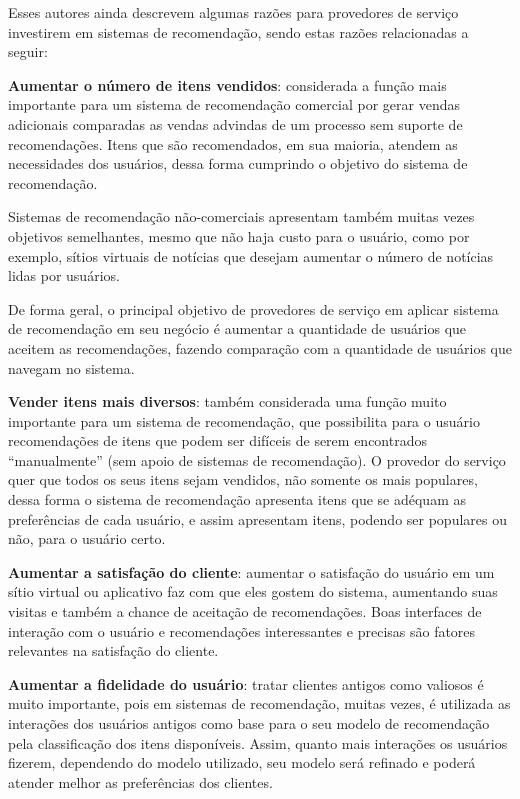 Esses autores ainda descrevem algumas razões para provedores de serviço investirem em sistemas de recomendação, sendo estas razões relacionadas a seguir:

\textbf{Aumentar o número de itens vendidos}: considerada a função mais importante para um sistema de recomendação comercial por gerar vendas adicionais comparadas as vendas advindas de um processo sem suporte de recomendações. Itens que são recomendados, em sua maioria, atendem as necessidades dos usuários, dessa forma cumprindo o objetivo do sistema de recomendação.

Sistemas de recomendação não-comerciais apresentam também muitas vezes objetivos semelhantes, mesmo que não haja custo para o usuário, como por exemplo, sítios virtuais de notícias que desejam aumentar o número de notícias lidas por usuários.

De forma geral, o principal objetivo de provedores de serviço em aplicar sistema de recomendação em seu negócio é aumentar a quantidade de usuários que aceitem as recomendações, fazendo comparação com a quantidade de usuários que navegam no sistema.

\textbf{Vender itens mais diversos}: também considerada uma função muito importante para um sistema de recomendação, que possibilita para o usuário recomendações de itens que podem ser difíceis de serem encontrados “manualmente” (sem apoio de sistemas de recomendação). O provedor do serviço quer que todos os seus itens sejam vendidos, não somente os mais populares, dessa forma o sistema de recomendação apresenta itens que se adéquam as preferências de cada usuário, e assim apresentam itens, podendo ser populares ou não, para o usuário certo.

\textbf{Aumentar a satisfação do cliente}: aumentar o satisfação do usuário em um sítio virtual ou aplicativo faz com que eles gostem do sistema, aumentando suas visitas e também a chance de aceitação de recomendações. Boas interfaces de interação com o usuário e recomendações interessantes e precisas são fatores relevantes na satisfação do cliente.

\textbf{Aumentar a fidelidade do usuário}: tratar clientes antigos como valiosos é muito importante, pois em sistemas de recomendação, muitas vezes, é utilizada as interações dos usuários antigos como base para o seu modelo de recomendação pela classificação dos itens disponíveis. Assim, quanto mais interações os usuários fizerem, dependendo do modelo utilizado, seu modelo será refinado e poderá atender melhor as preferências dos clientes.

